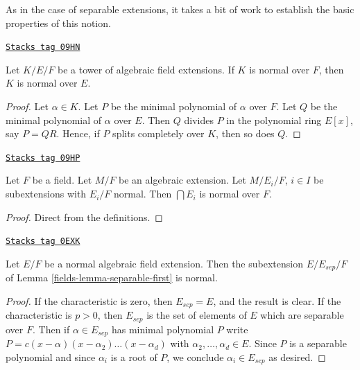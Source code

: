 As in the case of separable extensions, it takes a bit of work to establish
the basic properties of this notion.

\begin{lemma}
\label{fields-lemma-normal-goes-up}
\href{https://stacks.math.columbia.edu/tag/09HN}{\texttt{Stacks tag 09HN}}

Let $K/E/F$ be a tower of algebraic field extensions.
If $K$ is normal over $F$, then $K$ is normal over $E$.
\end{lemma}

\begin{proof}
Let $\alpha \in K$. Let $P$ be the minimal polynomial of $\alpha$ over $F$.
Let $Q$ be the minimal polynomial of $\alpha$ over $E$.
Then $Q$ divides $P$ in the polynomial ring $E[x]$, say $P = QR$.
Hence, if $P$ splits completely over $K$, then so does $Q$.
\end{proof}

\begin{lemma}
\label{fields-lemma-intersect-normal}
\href{https://stacks.math.columbia.edu/tag/09HP}{\texttt{Stacks tag 09HP}}

Let $F$ be a field. Let $M/F$ be an algebraic extension. Let
$M/E_i/F$, $i \in I$ be subextensions with
$E_i/F$ normal. Then $\bigcap E_i$ is normal over $F$.
\end{lemma}

\begin{proof}
Direct from the definitions.
\end{proof}

\begin{lemma}
\label{fields-lemma-separable-first-normal}
\href{https://stacks.math.columbia.edu/tag/0EXK}{\texttt{Stacks tag 0EXK}}

Let $E/F$ be a normal algebraic field extension. Then the subextension
$E/E_{sep}/F$ of Lemma \ref{fields-lemma-separable-first} is normal.
\end{lemma}

\begin{proof}
If the characteristic is zero, then $E_{sep} = E$, and the result
is clear. If the characteristic is $p > 0$, then $E_{sep}$
is the set of elements of $E$ which are separable over $F$.
Then if $\alpha \in E_{sep}$ has minimal polynomial $P$
write $P = c(x - \alpha)(x - \alpha_2) \ldots (x - \alpha_d)$
with $\alpha_2, \ldots, \alpha_d \in E$. Since
$P$ is a separable polynomial and since $\alpha_i$
is a root of $P$, we conclude $\alpha_i \in E_{sep}$ as desired.
\end{proof}

